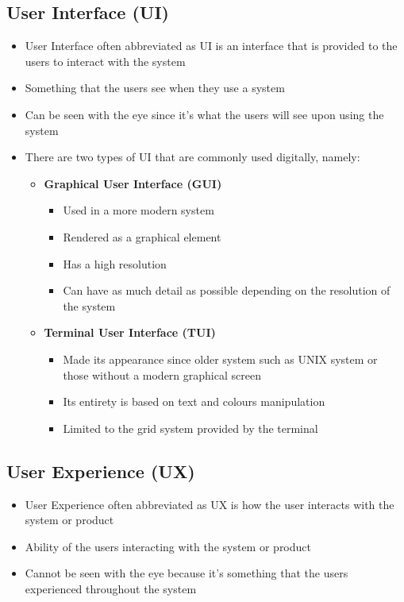 \documentclass[12pt,titlepage]{article}
\begin{document}
\subsection{User Interface (UI)}
\begin{itemize}
    \item User Interface often abbreviated as UI is an interface that is provided to the users to interact with the system
    \item Something that the users see when they use a system
    \item Can be seen with the eye since it's what the users will see upon using the system
    \item {
        There are two types of UI that are commonly used digitally, namely:
        \begin{itemize}
            \item {
                \textbf{Graphical User Interface (GUI)}
                \begin{itemize}
                    \item Used in a more modern system
                    \item Rendered as a graphical element
                    \item Has a high resolution
                    \item Can have as much detail as possible depending on the resolution of the system
                \end{itemize}
            }
            \item {
                \textbf{Terminal User Interface (TUI)}
                \begin{itemize}
                    \item Made its appearance since older system such as UNIX system or those without a modern graphical screen
                    \item Its entirety is based on text and colours manipulation
                    \item Limited to the grid system provided by the terminal
                \end{itemize}
            }
        \end{itemize}
    }
\end{itemize}

\subsection{User Experience (UX)}
\begin{itemize}
    \item User Experience often abbreviated as UX is how the user interacts with the system or product
    \item Ability of the users interacting with the system or product
    \item Cannot be seen with the eye because it's something that the users experienced throughout the system
\end{itemize}
\end{document}
